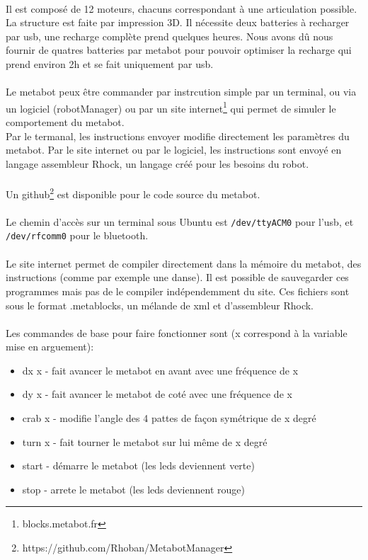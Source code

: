 \documentclass[10pt,a4paper]{report}
\begin{document}
\paragraph{}
Il est composé de 12 moteurs, chacuns correspondant à une articulation possible. La structure est faite par impression 3D. 
Il nécessite deux batteries à recharger par usb, une recharge complète prend quelques heures. Nous avons dû nous fournir de quatres batteries par metabot pour pouvoir optimiser la recharge qui prend environ 2h et se fait uniquement par usb.
\paragraph{}
Le metabot peux être commander par instrcution simple par un terminal, ou via un logiciel (robotManager) ou par un site internet\footnote{blocks.metabot.fr} qui permet de simuler le comportement du metabot.
\\
Par le termanal, les instructions envoyer modifie directement les paramètres du metabot. Par le site internet ou par le logiciel, les instructions sont envoyé en langage assembleur Rhock, un langage créé pour les besoins du robot.
\paragraph{}
Un github\footnote{https://github.com/Rhoban/MetabotManager} est disponible pour le code source du metabot.
\paragraph{}
Le chemin d'accès sur un terminal sous Ubuntu est \texttt{/dev/ttyACM0} pour l'usb, et \texttt{/dev/rfcomm0} pour le bluetooth. 

\paragraph{}
Le site internet permet de compiler directement dans la mémoire du metabot, des instructions (comme par exemple une danse). Il est possible de sauvegarder ces programmes mais pas de le compiler indépendemment du site. Ces fichiers sont sous le format .metablocks, un mélande de xml et d'assembleur Rhock.
\paragraph{}
Les commandes de base pour faire fonctionner sont (x correspond à la variable mise en arguement):\\
\begin{itemize}
\item dx x - fait avancer le metabot en avant avec une fréquence de x
\item dy x - fait avancer le metabot de coté avec une fréquence de x
\item crab x - modifie l'angle des 4 pattes de façon symétrique de x degré
\item turn x - fait tourner le metabot sur lui même de x degré
\item start - démarre le metabot (les leds deviennent verte)
\item stop - arrete le metabot (les leds deviennent rouge)
\end{itemize}
\end{document}
